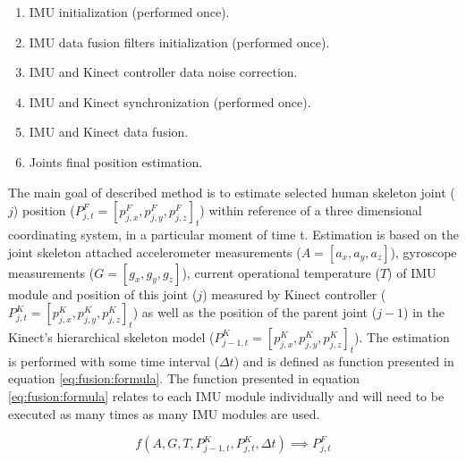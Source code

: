 \documentclass[sensors,article,submit,moreauthors,pdftex,10pt,a4paper]{mdpi}
\begin{document}
\begin{enumerate}[leftmargin=*,labelsep=3mm]
	\item IMU initialization (performed once).
	\item IMU data fusion filters initialization (performed once).
	\item IMU and Kinect controller data noise correction.
	\item IMU and Kinect synchronization (performed once).
	\item IMU and Kinect data fusion.
	\item Joints final position estimation. 
\end{enumerate}

The main goal of described method is to estimate selected human skeleton joint ($j$) position ($P^F_{j,t} = [p^F_{j,x}, p^F_{j,y}, p^F_{j,z}]_t$) within reference of a three dimensional coordinating system, in a particular moment of time t. Estimation is based on the joint skeleton attached accelerometer measurements ($A=[a_x,a_y,a_z]$), gyroscope measurements ($G=[g_x,g_y,g_z]$), current operational temperature ($T$) of IMU module and position of this joint ($j$) measured by Kinect controller ($P^K_{j,t} = [p^K_{j,x}, p^K_{j,y}, p^K_{j,z}]_t$) as well as the position of the parent joint ($j-1$) in the Kinect’s hierarchical skeleton model ($P^K_{j-1,t} = [p^K_{j,x}, p^K_{j,y}, p^K_{j,z}]_t$). The estimation is performed with some time interval ($\Delta t$) and is defined as function presented in equation \ref{eq:fusion:formula}. The function presented in equation \ref{eq:fusion:formula} relates to each IMU module individually and will need to be executed as many times as many IMU modules are used.

\begin{equation}
	f(A,G,T,P_{j-1,t}^K,P_{j,t}^K,\Delta t)\implies P_{j,t}^F
	\label{eq:fusion:formula}
\end{equation}
\end{document}
